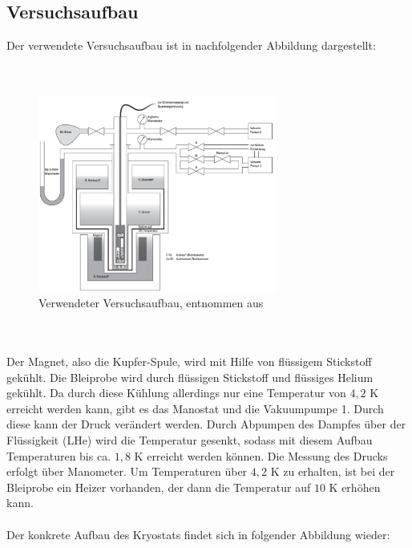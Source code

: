 \documentclass[german,  %
parskip=full,  %
]{scrartcl}
\begin{document}
\subsection{Versuchsaufbau}
Der verwendete Versuchsaufbau ist in nachfolgender Abbildung dargestellt:
\\\\\
\begin{figure}[h!]
\centering
\includegraphics[width=0.7\textwidth]{aufbau}
\caption{Verwendeter Versuchsaufbau, entnommen aus \cite{3}}
\end{figure}
\\\\
Der Magnet, also die Kupfer-Spule, wird mit Hilfe von flüssigem Stickstoff gekühlt. Die Bleiprobe wird durch flüssigen Stickstoff und flüssiges Helium gekühlt. Da durch diese Kühlung allerdings nur eine Temperatur von $4,2$ K erreicht werden kann, gibt es das Manostat und die Vakuumpumpe 1. Durch diese kann der Druck verändert werden. Durch Abpumpen des Dampfes über der Flüssigkeit (LHe) wird die Temperatur gesenkt, sodass mit diesem Aufbau Temperaturen bis ca. $1,8$ K erreicht werden können. Die Messung des Drucks erfolgt über Manometer. Um Temperaturen über $4,2$ K zu erhalten, ist bei der Bleiprobe ein Heizer vorhanden, der dann die Temperatur auf $10$ K erhöhen kann.
\\\\
Der konkrete Aufbau des Kryostats findet sich in folgender Abbildung wieder:
\end{document}
